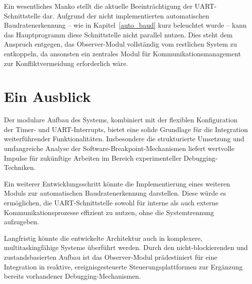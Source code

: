 Ein wesentliches Manko stellt die aktuelle Beeintr\"achtigung der UART-Schnittstelle dar. Aufgrund der nicht implementierten automatischen Baudratenerkennung -- wie in Kapitel~\ref{auto_baud} kurz beleuchtet wurde -- kann das Hauptprogramm diese Schnittstelle nicht parallel nutzen. Dies steht dem Anspruch entgegen, das Observer-Modul vollst\"andig vom restlichen System zu entkoppeln, da ansonsten ein zentrales Modul f\"ur Kommunikationsmanagement zur Konfliktvermeidung erforderlich w\"are.\AI


\section{Ein Ausblick}
\label{sec:EinAusblick}

Der modulare Aufbau des Systems, kombiniert mit der flexiblen Konfiguration der Timer- und UART-Interrupts, bietet eine solide Grundlage f\"ur die Integration weiterf\"uhrender Funktionalit\"aten. Insbesondere die strukturierte Umsetzung und umfangreiche Analyse der Software-Breakpoint-Mechanismen liefert wertvolle Impulse f\"ur zuk\"unftige Arbeiten im Bereich experimenteller Debugging-Techniken.

Ein weiterer Entwicklungsschritt k\"onnte die Implementierung eines weiteren Moduls zur automatischen Baudratenerkennung darstellen. Diese w\"urde es erm\"oglichen, die UART-Schnittstelle sowohl f\"ur interne als auch externe Kommunikationsprozesse effizient zu nutzen, ohne die Systemtrennung aufzugeben.

Langfristig k\"onnte die entwickelte Architektur auch in komplexere, multitaskingf\"ahige Systeme \"uberf\"uhrt werden. Durch den nicht-blockierenden und zustandsbasierten Aufbau ist das Observer-Modul pr\"adestiniert f\"ur eine Integration in reaktive, ereignisgesteuerte Steuerungsplattformen zur Erg\"anzung bereits vorhandener Debugging-Mechanismen.